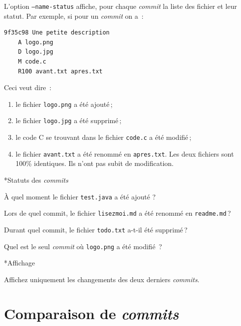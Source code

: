 \documentclass[a4paper,11pt]{style-esi/td}
\begin{document}
L'option \texttt{--name-status} affiche, pour chaque \textit{commit} la liste
des fichier et leur statut.  Par exemple, si pour un \textit{commit} on a~:

\begin{verbatim}
9f35c98 Une petite description
    A logo.png 
    D logo.jpg 
    M code.c 
    R100 avant.txt apres.txt 
\end{verbatim}

Ceci veut dire~:

\begin{enumerate}
	\item le fichier \texttt{logo.png} a été ajouté ;
	\item le fichier \texttt{logo.jpg} a été supprimé ;
	\item le code C se trouvant dans le fichier \texttt{code.c} a été modifié ;
	\item le fichier \texttt{avant.txt} a été renommé en \texttt{apres.txt}. Les 
		deux fichiers sont 100\% identiques. Ils n'ont pas subit de modification. 
\end{enumerate}

\begin{Exercice}*{Statuts des \textit{commits}}
\begin{steps}
	
	\item À quel moment le fichier \texttt{test.java} a été ajouté ?
	\item Lors de quel commit, le fichier \texttt{lisezmoi.md} a été renommé en 
		\texttt{readme.md} ?
	\item Durant quel commit, le fichier \texttt{todo.txt} a-t-il été supprimé ?
	\item Quel est le seul \textit{commit} où \texttt{logo.png} a été modifié ? 

\end{steps}
\end{Exercice}

\begin{Exercice}*{Affichage}
	\begin{steps}
	\item Affichez uniquement les changements des deux derniers \textit{commits}. 
	\end{steps}
\end{Exercice}


\section{Comparaison de \textit{commits}}
\end{document}
